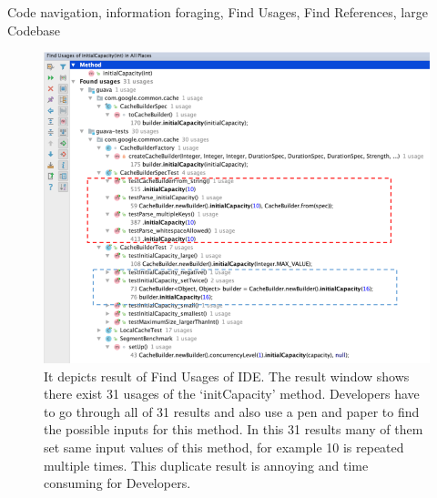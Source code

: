 \documentclass[conference]{IEEEtran}
\begin{document}
\begin{IEEEkeywords}
Code navigation, information foraging, Find Usages, Find References, large Codebase
\end{IEEEkeywords}

\begin{figure}
    \centering
    \includegraphics [width=\columnwidth,keepaspectratio, clip]{figures/Picture1}
    \caption{It depicts result of Find Usages of IDE. The result window shows there exist 31 usages of the ‘initCapacity’ method. Developers have to go through all of 31 results and also use a pen and paper to find the possible inputs for this method. In this 31 results many of them set same input values of this method, for example 10 is repeated multiple times. This duplicate result is annoying and time consuming for Developers. 
}
\label{fig:usege}
\end{figure}
\end{document}
